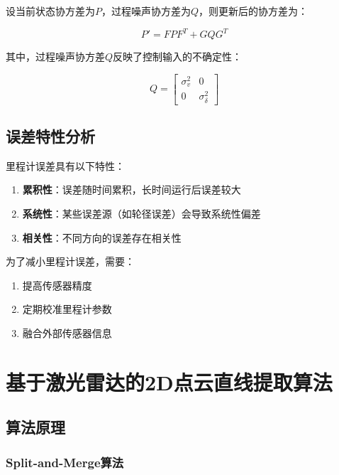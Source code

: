 \documentclass[12pt,a4paper]{report}
\begin{document}
设当前状态协方差为$P$，过程噪声协方差为$Q$，则更新后的协方差为：

\begin{equation}
P' = F P F^T + G Q G^T
\end{equation}

其中，过程噪声协方差$Q$反映了控制输入的不确定性：

\begin{equation}
Q = 
\begin{bmatrix}
\sigma_v^2 & 0 \\
0 & \sigma_\delta^2
\end{bmatrix}
\end{equation}

\section{误差特性分析}

里程计误差具有以下特性：

\begin{enumerate}[itemsep=0pt]
    \item \textbf{累积性}：误差随时间累积，长时间运行后误差较大
    \item \textbf{系统性}：某些误差源（如轮径误差）会导致系统性偏差
    \item \textbf{相关性}：不同方向的误差存在相关性
\end{enumerate}

为了减小里程计误差，需要：

\begin{enumerate}[itemsep=0pt]
    \item 提高传感器精度
    \item 定期校准里程计参数
    \item 融合外部传感器信息
\end{enumerate}

\chapter{基于激光雷达的2D点云直线提取算法}

\section{算法原理}

\subsection{Split-and-Merge算法}
\end{document}

